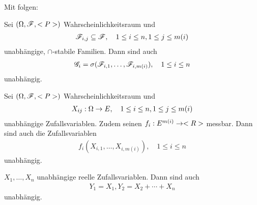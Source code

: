 Mit  folgen:

\begin{conclusion}
	Sei $(\Omega,\mathscr F,<P>)$ Wahrscheinlichkeitsraum und
	\begin{align*}
		\mathscr F_{i,j} \subseteq \mathscr F, \quad 1 \le i \le n, 1 \le j \le m(i)
	\end{align*}
	unabhängige, $\cap$-stabile Familien.
	Dann sind auch
	\begin{align*}
		\mathscr{G}_i = \sigma(\mathscr F_{i,1}, \dots , \mathscr F_{i,m(i)}), \quad 1 \le i \le n
	\end{align*}
	unabhängig.
\end{conclusion}

\begin{conclusion}
	Sei $(\Omega,\mathscr F,<P>)$ Wahrscheinlichkeitsraum und
	\begin{align*}
		X_{ij}: \Omega \to E, \quad 1 \le i \le n, 1 \le j \le m(i)
	\end{align*}
	unabhängige Zufallsvariablen. Zudem seinen $f_i: E^{m(i)} \to <R>$ messbar. Dann sind auch die Zufallsvariablen
	\begin{align*}
		f_i(X_{i,1}, \dots, X_{i,m(i)}), \quad 1 \le i \le n
	\end{align*}
	unabhängig.
\end{conclusion}

\begin{example}
	$X_1, \dots, X_n$ unabhängige reelle Zufallsvariablen. Dann sind auch
	\begin{align*}
	Y_1 = X_1, Y_2 = X_2 + \cdots + X_n
	\end{align*}
	unabhängig.
\end{example}